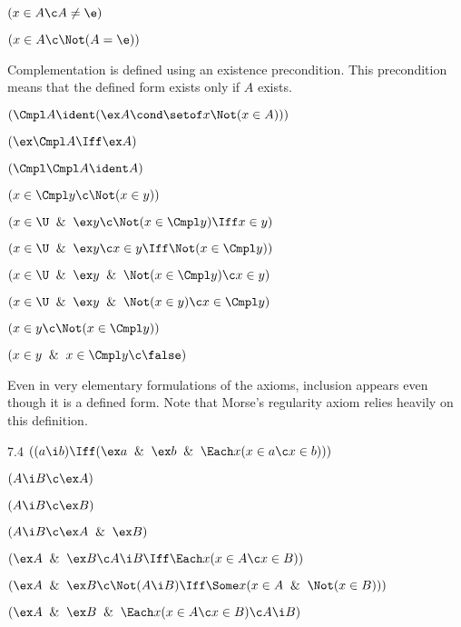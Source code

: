  $(x \in A \c A \ne \e)$

 $(x \in A \c \Not (A = \e))$
\lineb


Complementation is defined using an existence precondition.  This precondition means
that the defined form exists only if $A$ exists.


 $(\Cmpl A \ident (\ex A \cond \setof x \Not(x \in A)))$


 $(\ex \Cmpl A \Iff \ex A)$

 $(\Cmpl \Cmpl A  \ident A)$

 $(x \in \Cmpl y \c \Not(x \in y))$

 $(x \in \U \And \ex y \c \Not(x \in \Cmpl y) \Iff x \in y)$

 $(x \in \U \And \ex y \c x \in y \Iff \Not(x \in \Cmpl y))$

 $(x \in \U \And \ex y \And \Not(x \in \Cmpl y) \c x \in y)$

 $(x \in \U \And \ex y \And \Not(x \in y) \c x \in \Cmpl y)$

 $(x \in y \c \Not(x \in \Cmpl y))$

 $(x \in y \And x \in \Cmpl y\c \false)$

\lineb


Even in very elementary formulations of the axioms, inclusion appears
even though it is a defined form.  Note that Morse's regularity axiom
relies heavily on this definition.
\lineb


\noindent{}7.4 $((a \i b) \Iff (\ex a \And \ex b \And \Each x (x \in a \c x \in b)))$


 $(A \i B \c \ex A)$

 $(A \i B \c \ex B)$

 $(A \i B \c \ex A \And \ex B)$

 $(\ex A \And \ex B \c A \i B \Iff \Each x (x \in A \c x \in B))$

 $(\ex A \And \ex B \c \Not(A \i B) \Iff \Some x (x \in A \And \Not(x \in B)))$

 $(\ex A \And \ex B \And \Each x(x \in A\c x\in B) \c A \i B)$

